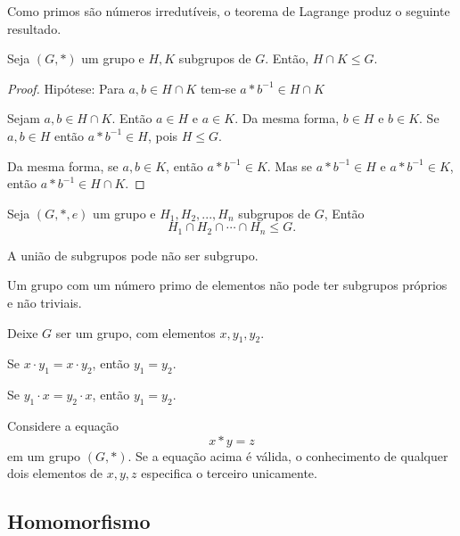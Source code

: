 Como primos são números irredutíveis, o teorema de Lagrange produz o seguinte resultado.

\begin{theorem}
  Seja $(G,*)$ um grupo e $H,K$ subgrupos de $G$. Então, $H\cap K \leq G$.
  \begin{proof}
    Hipótese: Para $a,b \in H \cap K$ tem-se $a * b^{-1} \in H \cap K$

    Sejam $a,b \in H \cap K$. Então $a \in H$ e $a \in K$. Da mesma forma, $b \in H$ e $b \in K$. Se $a,b \in H$ então $a * b^{-1} \in H$, pois $H \leq G$.

    Da mesma forma, se $a,b \in K$, então $a * b^{-1} \in K$. Mas se $a * b^{-1} \in H$ e $a * b^{-1} \in K$, então $a * b^{-1} \in H \cap K$.
  \end{proof}
\end{theorem}

\begin{theorem}
  Seja $(G, *, e)$ um grupo e $H_{1},H_{2}, ..., H_{n}$ subgrupos de $G$, Então $$ H_{1} \cap H_{2} \cap \cdots \cap H_{n} \leq G.$$
\end{theorem}

\begin{stat}
  A união de subgrupos pode não ser subgrupo.
\end{stat}

\begin{stat}
  Um grupo com um número primo de elementos não pode ter subgrupos próprios e não triviais.
\end{stat}

\begin{stat}
  Deixe $G$ ser um grupo, com elementos $x,y_{1},y_{2}$.
  

  Se $x\cdot y_{1} = x\cdot y_{2}$, então $y_{1} = y_{2}$.

  Se $y_{1}\cdot x = y_{2}\cdot x$, então $y_{1} = y_{2}$.
\end{stat}
\begin{corollary}\label{UnicSolu}
  Considere a equação $$x * y = z$$
  em um grupo $(G,*)$. Se a equação acima é válida, o conhecimento de qualquer dois elementos de $x,y,z$ especifica o terceiro unicamente.
\end{corollary}

\subsection{Homomorfismo}

